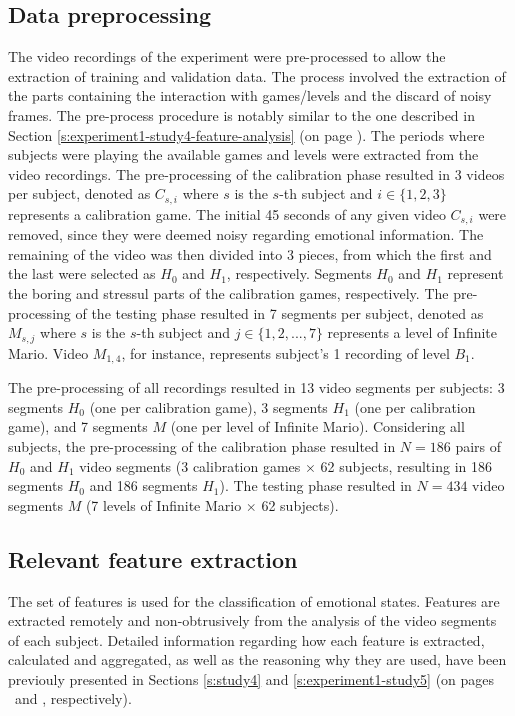 \subsection{Data preprocessing}

The video recordings of the experiment were pre-processed to allow the extraction of training and validation data. The process involved the extraction of the parts containing the interaction with games/levels and the discard of noisy frames. The pre-process procedure is notably similar to the one described in Section \ref{s:experiment1-study4-feature-analysis} (on page \pageref{s:experiment1-study4-feature-analysis}). The periods where subjects were playing the available games and levels were extracted from the video recordings. The pre-processing of the calibration phase resulted in 3 videos per subject, denoted as $C_{s,i}$ where $s$ is the $s$-th subject and $i \in \{1, 2, 3\}$ represents a calibration game. The initial 45 seconds of any given video $C_{s,i}$ were removed, since they were deemed noisy regarding emotional information. The remaining of the video was then divided into 3 pieces, from which the first and the last were selected as $H_0$ and $H_1$, respectively. Segments $H_0$ and $H_1$ represent the boring and stressul parts of the calibration games, respectively. The pre-processing of the testing phase resulted in 7 segments per subject, denoted as $M_{s,j}$ where $s$ is the $s$-th subject and $j \in \{1, 2, ..., 7\}$ represents a level of Infinite Mario. Video $M_{1,4}$, for instance, represents subject's 1 recording of level $B_1$.

The pre-processing of all recordings resulted in 13 video segments per subjects: 3 segments $H_0$ (one per calibration game), 3 segments $H_1$ (one per calibration game), and 7 segments $M$ (one per level of Infinite Mario). Considering all subjects, the pre-processing of the calibration phase resulted in $N=186$ pairs of $H_0$ and $H_1$ video segments (3 calibration games $\times$ 62 subjects, resulting in 186 segments $H_0$ and 186 segments $H_1$). The testing phase resulted in $N=434$ video segments $M$ (7 levels of Infinite Mario $\times$ 62 subjects).

\subsection{Relevant feature extraction}

The set of features is used for the classification of emotional states. Features are extracted remotely and non-obtrusively from the analysis of the video segments of each subject. Detailed information regarding how each feature is extracted, calculated and aggregated, as well as the reasoning why they are used, have been previouly presented in Sections \ref{s:study4} and \ref{s:experiment1-study5} (on pages \pageref{s:study4}\ and \pageref{s:experiment1-study5}, respectively).

